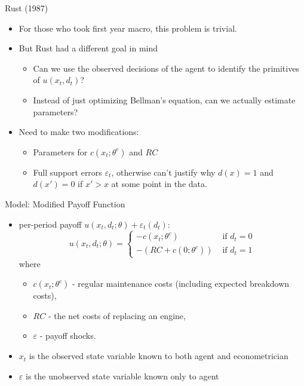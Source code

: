 \documentclass[aspectratio=169,11pt]{beamer}
\begin{document}
\begin{frame}{Rust (1987)}
\begin{itemize}
\item For those who took first year macro, this problem is trivial.
\item But Rust had a different goal in mind
\begin{itemize}
\item Can we use the observed decisions of the agent to identify the primitives of $u(x_t,d_t)$?
\item Instead of just optimizing Bellman's equation, can we actually \alert{estimate parameters}?
\end{itemize}
\item Need to make two modifications:
\begin{itemize}
\item Parameters for $c(x_t;\theta^c)$ and $RC$
\item Full support errors $\varepsilon_{t}$, otherwise can't justify why $d(x)=1$ and $d(x')=0$ if $x'>x$ at some point in the data.
\end{itemize}
\end{itemize}
\end{frame}

\begin{frame}{Model: Modified Payoff Function}
\begin{itemize}
	\item per-period payoff $u \left(x_{t},d_{t}; \theta\right)+\varepsilon_{t}\left(d_{t}\right)$:\[
		u \left(x_{t},d_{t}; \theta\right)=
		\begin{cases}
		-c\left(x_{t};\theta^c\right) & \mbox{ if }d_{t}=0\\
		-\left(RC+c\left(0;\theta^c\right)\right) & \mbox{ if }d_{t}=1
		\end{cases}
		\]
	where \\
	\begin{itemize}
		\item $c\left(x_{t};\theta^c\right) $ -  regular maintenance costs (including expected breakdown costs),
		\item $RC$ - the net costs of replacing an engine,
		\item $\varepsilon$ - payoff shocks.
	\end{itemize}

	\item $x_{t}$ is the \alert{observed state variable} known to both agent and econometrician
	\item $\varepsilon$ is the \alert{unobserved state variable} known only to agent
\end{itemize}
\end{frame}
\end{document}
